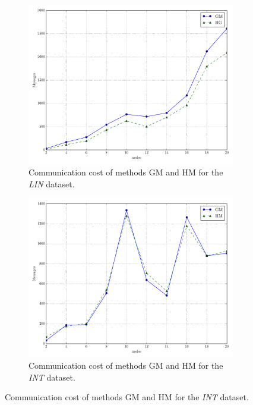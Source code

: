 \begin{figure}[!htb]
\begin{subfigure}{0.32\textwidth}
  \includegraphics[width=\linewidth]{img/bal_msg_linear_nodes.pdf}
  \caption{Communication cost of methods GM and HM for the \emph{LIN} dataset.}
\end{subfigure}\hfill
\begin{subfigure}{0.32\textwidth}
  \includegraphics[width=\linewidth]{img/bal_msg_interweaving_nodes.pdf}
  \caption{Communication cost of methods GM and HM for the \emph{INT} dataset.}
\end{subfigure}\hfill

\end{figure}
